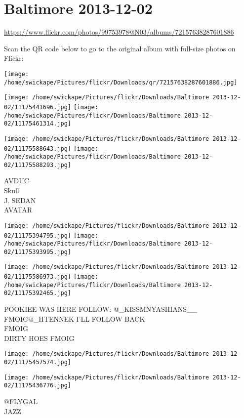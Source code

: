 \documentclass[10pt,letterpaper]{article}
\title{}
\author{}
\date{}
\begin{document}
\section*{Baltimore 2013-12-02}

\url{https://www.flickr.com/photos/99753978@N03/albums/72157638287601886}

Scan the QR code below to go to the original album with full-size photos on Flickr:

\texttt{[image: /home/swickape/Pictures/flickr/Downloads/qr/72157638287601886.jpg]}
\pagebreak

\texttt{[image: /home/swickape/Pictures/flickr/Downloads/Baltimore 2013-12-02/11175441696.jpg]}
\texttt{[image: /home/swickape/Pictures/flickr/Downloads/Baltimore 2013-12-02/11175461314.jpg]}

\texttt{[image: /home/swickape/Pictures/flickr/Downloads/Baltimore 2013-12-02/11175588643.jpg]}
\texttt{[image: /home/swickape/Pictures/flickr/Downloads/Baltimore 2013-12-02/11175588293.jpg]}

AVDUC\\
Skull\\
J. SEDAN\\
AVATAR
\pagebreak

\texttt{[image: /home/swickape/Pictures/flickr/Downloads/Baltimore 2013-12-02/11175394795.jpg]}
\texttt{[image: /home/swickape/Pictures/flickr/Downloads/Baltimore 2013-12-02/11175393995.jpg]}

\texttt{[image: /home/swickape/Pictures/flickr/Downloads/Baltimore 2013-12-02/11175586973.jpg]}
\texttt{[image: /home/swickape/Pictures/flickr/Downloads/Baltimore 2013-12-02/11175392465.jpg]}

POOKIEE WAS HERE FOLLOW: @\_KISSMNYASHIANS\_\_\\
FMOIG@\_HTENNEK I'LL FOLLOW BACK\\
FMOIG\\
DIRTY HOES FMOIG
\pagebreak

\texttt{[image: /home/swickape/Pictures/flickr/Downloads/Baltimore 2013-12-02/11175457574.jpg]}

\vspace{0.25in}
\texttt{[image: /home/swickape/Pictures/flickr/Downloads/Baltimore 2013-12-02/11175436776.jpg]}

@FLYGAL\\
JAZZ
\pagebreak
\end{document}
